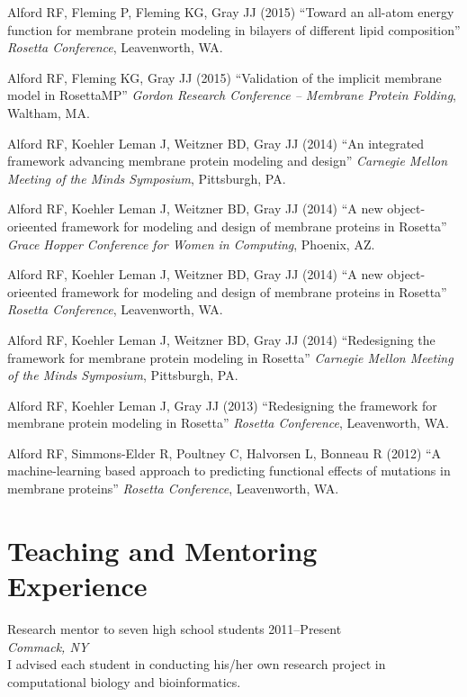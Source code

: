 \documentclass[11pt]{article}
\newcommand{\allcapsspacing}[1]{{\addfontfeature{LetterSpace=7.5}#1}}
\newcommand{\outreachitem}[4]{
{#1} \hfill {#2} \\
#3 \smallskip
#4 
\par\vspace{0.5\baselineskip}}
\newcommand{\researchitem}[4]{
\outreachitem{#1}{#2}{\textit{#3}}{\vspace{0\baselineskip}#4}}
\begin{document}
\begin{etaremune}
\item Alford RF, Fleming P, Fleming KG, Gray JJ (2015) ``Toward an all-atom energy function for membrane protein modeling in bilayers of different lipid composition'' \textit{Rosetta Conference}, Leavenworth, WA.
\item Alford RF, Fleming KG, Gray JJ (2015) ``Validation of the implicit membrane model in RosettaMP'' \textit{Gordon Research Conference -- Membrane Protein Folding}, Waltham, MA.
\item Alford RF, Koehler Leman J, Weitzner BD, Gray JJ (2014) ``An integrated framework advancing membrane protein modeling and design'' \textit{Carnegie Mellon Meeting of the Minds Symposium}, Pittsburgh, PA.
\item Alford RF, Koehler Leman J, Weitzner BD, Gray JJ (2014) ``A new object-orieented framework for modeling and design of membrane proteins in Rosetta'' \textit{Grace Hopper Conference for Women in Computing}, Phoenix, AZ.
\item Alford RF, Koehler Leman J, Weitzner BD, Gray JJ (2014) ``A new object-orieented framework for modeling and design of membrane proteins in Rosetta'' \textit{Rosetta Conference}, Leavenworth, WA.
\item Alford RF, Koehler Leman J, Weitzner BD, Gray JJ (2014) ``Redesigning the framework for membrane protein modeling in Rosetta'' \textit{Carnegie Mellon Meeting of the Minds Symposium}, Pittsburgh, PA.
\item Alford RF, Koehler Leman J, Gray JJ (2013) ``Redesigning the framework for membrane protein modeling in Rosetta'' \textit{Rosetta Conference}, Leavenworth, WA.
\item Alford RF, Simmons-Elder R, Poultney C, Halvorsen L, Bonneau R (2012) ``A machine-learning based approach to predicting functional effects of mutations in membrane proteins'' \textit{Rosetta Conference}, Leavenworth, WA.
\end{etaremune}

\section*{\allcapsspacing{Teaching and Mentoring Experience}}

\researchitem{Research mentor to seven high school students}{2011--Present}{Commack, NY}{\\I advised each student in conducting his/her own research project in computational biology and bioinformatics.}
\end{document}
